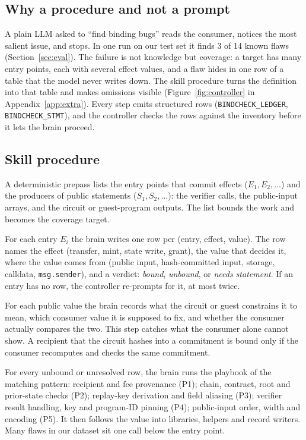 \subsection{Why a procedure and not a prompt}\label{sec:design-why}

A plain LLM asked to ``find binding bugs'' reads the consumer, notices the
most salient issue, and stops. In one run on our test set it finds 3 of 14 known
flaws (Section~\ref{sec:eval}). The failure is not knowledge but coverage: a target
has many entry points, each with several effect values, and a flaw hides in
one row of a table that the model never writes down. The skill procedure turns
the definition into that table and makes omissions visible
(Figure~\ref{fig:controller} in Appendix~\ref{app:extra}). Every step emits
structured rows (\texttt{BINDCHECK\_LEDGER}, \texttt{BINDCHECK\_STMT}), and the
controller checks the rows against the inventory before it lets the brain
proceed.


\subsection{Skill procedure}\label{sec:design-skills}

A deterministic prepass lists the entry points that commit effects ($E_1,
E_2,\dots$) and the producers of public statements ($S_1, S_2,\dots$): the
verifier calls, the public-input arrays, and the circuit or guest-program
outputs. The list bounds the work and becomes the coverage target.

For each entry $E_i$ the brain writes one row per (entry, effect, value). The
row names the effect (transfer, mint, state write, grant), the value that
decides it, where the value comes from (public input, hash-committed input,
storage, calldata, \texttt{msg.sender}), and a verdict: \emph{bound},
\emph{unbound}, or \emph{needs statement}. If an entry has no row, the
controller re-prompts for it, at most twice.

For each public value the brain records what the circuit or guest constrains
it to mean, which consumer value it is supposed to fix, and whether the
consumer actually compares the two. This step catches what the consumer alone
cannot show. A recipient that the circuit hashes into a commitment is bound
only if the consumer recomputes and checks the same commitment.

For every unbound or unresolved row, the brain runs the playbook of the
matching pattern: recipient and fee provenance (P1); chain, contract, root and
prior-state checks (P2); replay-key derivation and field aliasing (P3);
verifier result handling, key and program-ID pinning (P4); public-input
order, width and encoding (P5). It then follows the value into libraries,
helpers and record writers. Many flaws in our dataset sit one call below the
entry point.

